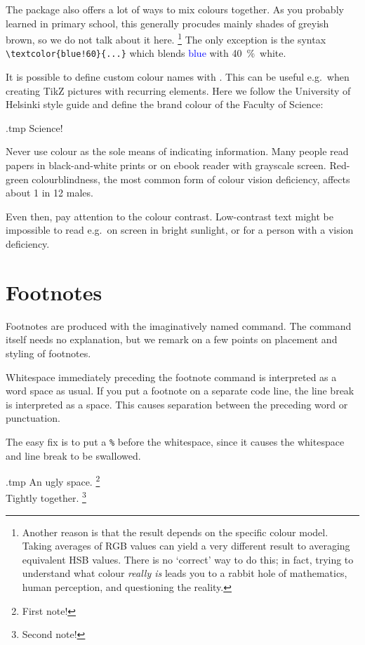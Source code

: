 The package also offers a lot of ways to mix colours together.
As you probably learned in primary school,
this generally procudes mainly shades of greyish brown, so we do not talk about it here.%
\footnote{Another reason is that the result depends on the specific colour model.
Taking averages of RGB values can yield a very different result to averaging equivalent HSB values.
There is no `correct' way to do this;
in fact, trying to understand what colour \emph{really is}
leads you to a rabbit hole of mathematics, human perception, and questioning the reality.}
The only exception is the syntax \verb|\textcolor{blue!60}{...}|
which blends \textcolor{blue}{blue} with \textcolor{blue!60}{40~\%~white}.%
\label{ex:color blending}

It is possible to define custom colour names with .
This can be useful e.g.\ when creating TikZ pictures with recurring elements.
Here we follow the University of Helsinki style guide
and define the brand colour of the Faculty of Science:
%
\begin{VerbatimOut}{\jobname.tmp}
\textcolor{Sciency}{Science!}
\end{VerbatimOut}
\ShowExample

\begin{practices}
Never use colour as the sole means of indicating information.
Many people read papers in black-and-white prints
or on ebook reader with grayscale screen.
Red-green colourblindness,
the most common form of colour vision deficiency,
affects about 1 in 12 males.

Even then, pay attention to the colour contrast.
Low-contrast text might be impossible to read e.g.\ on screen in bright sunlight,
or for a person with a vision deficiency.
\end{practices}


%
%
%
\section{Footnotes}\label{sec:footnotes}

Footnotes are produced with the imaginatively named  command.
The command itself needs no explanation,
but we remark on a few points on placement and styling of footnotes.

\begin{gotcha}
Whitespace immediately preceding the footnote command is interpreted as a word space as usual.
If you put a footnote on a separate code line,
the line break is interpreted as a space.
This causes separation between the preceding word or punctuation.

The easy fix is to put a \verb|%| before the whitespace,
since it causes the whitespace and line break to be swallowed.
\begin{VerbatimOut}{\jobname.tmp}
An ugly space.
\footnote{First note!}\\

Tightly together.%
\footnote{Second note!}
\end{VerbatimOut}
\ShowExample
\end{gotcha}

